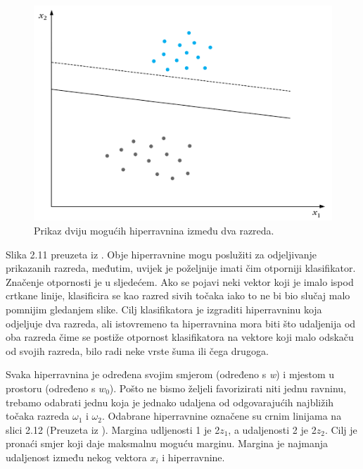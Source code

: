 \documentclass[times, utf8, zavrsni, numeric]{fer}
\begin{document}
\begin{figure}[htbp]
\centering
\includegraphics[scale=0.5]{img/linearniklasifikator.png}
\caption{Prikaz  dviju mogućih hiperravnina između dva razreda.}
\end{figure}

Slika 2.11 preuzeta iz \citep{pattern}. Obje 
hiperravnine mogu poslužiti za odjeljivanje prikazanih razreda, međutim, 
uvijek je poželjnije imati čim otporniji klasifikator. Značenje otpornosti je u 
sljedećem. Ako se pojavi neki vektor koji je imalo ispod crtkane linije, 
klasificira se kao razred sivih točaka iako to ne bi bio slučaj malo pomnijim 
gledanjem slike. Cilj klasifikatora je izgraditi hiperravninu koja odjeljuje dva 
razreda, ali istovremeno ta hiperravnina mora biti što udaljenija od oba razreda 
čime se postiže otpornost klasifikatora na vektore koji malo odskaču od svojih razreda, 
bilo radi neke vrste šuma ili čega drugoga. 

\bigbreak

Svaka hiperravnina je određena svojim smjerom (određeno s \textit{w}) i mjestom u prostoru (određeno s \(w_0\)). 
Pošto ne bismo željeli favorizirati niti jednu ravninu, trebamo odabrati jednu koja je 
jednako udaljena od odgovarajućih najbližih točaka razreda \(\omega_1\) i \(\omega_2\).  Odabrane hiperravnine 
označene su crnim linijama na slici 2.12 (Preuzeta iz \citep{pattern}). Margina udljenosti 1 je 2\(z_1\), a udaljenosti 2 je 2\(z_2\). 
Cilj je pronaći smjer koji daje maksmalnu moguću marginu. Margina je najmanja udaljenost 
između nekog vektora \(x_i\) i hiperravnine.
\end{document}
